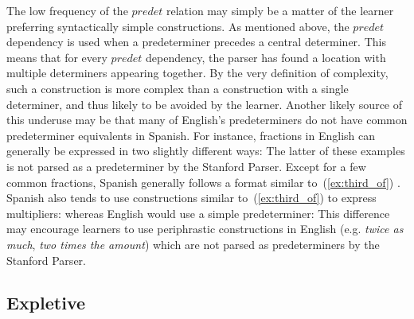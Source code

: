 \documentclass[main.tex]{subfiles}
\begin{document}
The low frequency of the $predet$ relation may simply be a matter of the learner preferring syntactically simple constructions. As mentioned above, the $predet$ dependency is used when a predeterminer precedes a central determiner. This means that for every $predet$ dependency, the parser has found a location with multiple determiners appearing together. By the very definition of complexity, such a construction is more complex than a construction with a single determiner, and thus likely to be avoided by the learner. Another likely source of this underuse may be that many of English's predeterminers do not have common predeterminer equivalents in Spanish. For instance, fractions in English can generally be expressed in two slightly different ways:
The latter of these examples is not parsed as a predeterminer by the Stanford Parser. Except for a few common fractions, Spanish generally follows a format similar to~(\ref{ex:third_of}) \citep[pp. 122-3]{butt}. Spanish also tends to use constructions similar to~(\ref{ex:third_of}) to express multipliers:
whereas English would use a simple predeterminer:
This difference may encourage learners to use periphrastic constructions in English (e.g. \textit{twice as much}, \textit{two times the amount}) which are not parsed as predeterminers by the Stanford Parser.

\subsection{Expletive}
\end{document}
